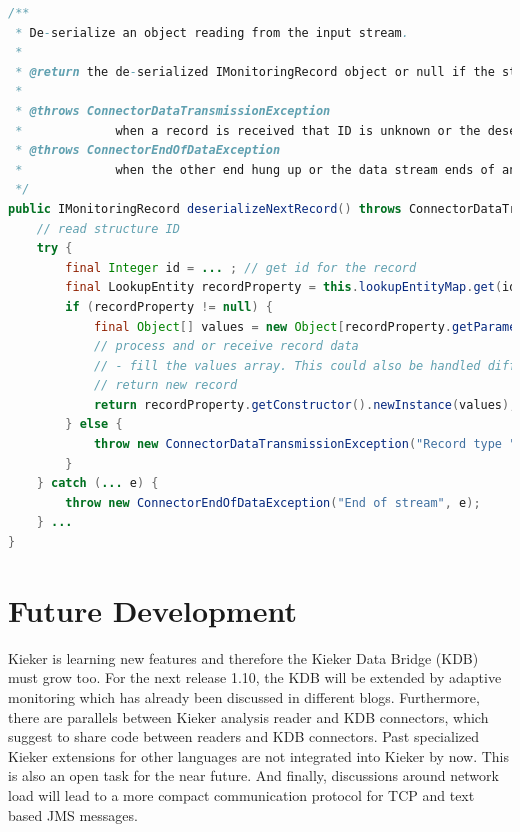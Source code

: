 \documentclass[11pt,a4paper]{article}
\begin{document}
\begin{lstlisting}[language=Java,caption=De-serialization method example]
/**
 * De-serialize an object reading from the input stream.
 * 
 * @return the de-serialized IMonitoringRecord object or null if the stream was terminated by the client.
 * 
 * @throws ConnectorDataTransmissionException
 *             when a record is received that ID is unknown or the deserialization fails
 * @throws ConnectorEndOfDataException
 *             when the other end hung up or the data stream ends of another reason
 */
public IMonitoringRecord deserializeNextRecord() throws ConnectorDataTransmissionException, ConnectorEndOfDataException {
	// read structure ID
	try {
		final Integer id = ... ; // get id for the record
		final LookupEntity recordProperty = this.lookupEntityMap.get(id);
		if (recordProperty != null) {
			final Object[] values = new Object[recordProperty.getParameterTypes).length];
			// process and or receive record data
			// - fill the values array. This could also be handled differently.
			// return new record
			return recordProperty.getConstructor().newInstance(values);
		} else {
			throw new ConnectorDataTransmissionException("Record type " + id + " is not registered.");
		}
	} catch (... e) {
		throw new ConnectorEndOfDataException("End of stream", e);
	} ...
}
\end{lstlisting}


\section{Future Development}\label{s:outlook}

Kieker is learning new features and therefore the Kieker Data Bridge (KDB) must grow too. For the next release 1.10, the KDB will be extended by adaptive monitoring which has already been discussed in different blogs. Furthermore, there are parallels between Kieker analysis reader and KDB connectors, which suggest to share code between readers and KDB connectors. Past specialized Kieker extensions for other languages are not integrated into Kieker by now. This is also an open task for the near future. And finally, discussions around network load will lead to a more compact communication protocol for TCP and text based JMS messages.
\end{document}
